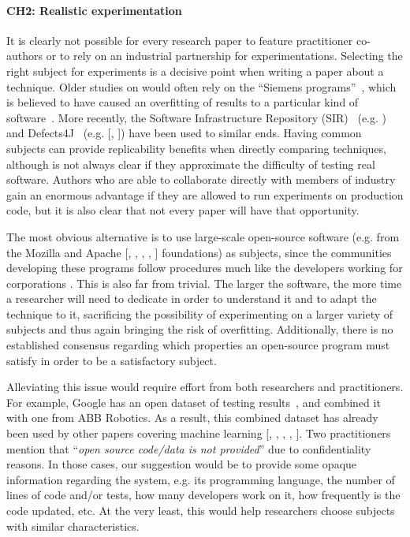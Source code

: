 \paragraph{CH2: Realistic experimentation}
It is clearly not possible for every research paper to feature practitioner co-authors or to rely on an industrial partnership for experimentations.
Selecting the right subject for experiments is a decisive point when writing a paper about a technique.
Older studies on \rt would often rely on the ``Siemens programs''~\cite{hutchins1994experiments}, which is believed to have caused an overfitting of results to a particular kind of software~\cite{do_recent_2016}.
More recently, the Software Infrastructure Repository (SIR)~\cite{do2005supporting} (e.g. ) and Defects4J~\cite{just2014defects4j} (e.g. [, ]) have been used to similar ends.
Having common subjects can provide replicability benefits when directly comparing techniques, although is not always clear if they approximate the difficulty of testing real software.
Authors who are able to collaborate directly with members of industry gain an enormous advantage if they are allowed to run experiments on production code, but it is also clear that not every paper will have that opportunity.

The most obvious alternative is to use large-scale open-source software (e.g. from the Mozilla  and Apache 
[, 
, 
, 
, 
]
 foundations) as subjects, since the communities developing these programs follow procedures much like the developers working for corporations .
This is also far from trivial.
The larger the software, the more time a researcher will need to dedicate in order to understand it and to adapt the technique to it, sacrificing the possibility of experimenting on a larger variety of subjects and thus again bringing the risk of overfitting.
Additionally, there is no established consensus regarding which properties an open-source program must satisfy in order to be a satisfactory subject.

Alleviating this issue would require effort from both researchers and practitioners.
For example, Google has an open dataset of testing results~\cite{googledataset}, and  combined it with one from ABB Robotics.
As a result, this combined dataset has already been used by other papers covering machine learning 
[, 
, 
, 
, 
].
Two practitioners mention that ``\textit{open source code/data is not provided}'' due to confidentiality reasons.
In those cases, our suggestion would be to provide some opaque information regarding the system, e.g. its programming language, the number of lines of code and/or tests, how many developers work on it, how frequently is the code updated, etc.
At the very least, this would help researchers choose subjects with similar characteristics.

